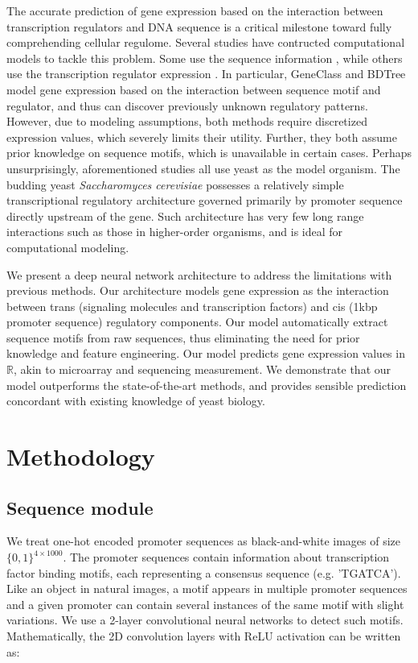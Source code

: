 \documentclass{article}
\begin{document}
The accurate prediction of gene expression based on the interaction between transcription regulators and DNA sequence is a critical milestone toward fully comprehending cellular regulome. Several studies have contructed computational models to tackle this problem. Some use the sequence information \cite{Bussemaker:2001ft,Phuong:2004kk}, while others use the transcription regulator expression \cite{Soinov:2003iz,Segal:2003ks}. In particular, GeneClass\cite{Middendorf:2004gta} and BDTree\cite{Ruan:2006hl} model gene expression based on the interaction between sequence motif and regulator, and thus can discover previously unknown regulatory patterns. However, due to modeling assumptions, both methods require discretized expression values, which severely limits their utility. Further, they both assume prior knowledge on sequence motifs, which is unavailable in certain cases. Perhaps unsurprisingly, aforementioned studies all use yeast as the model organism. The budding yeast \textit{Saccharomyces cerevisiae} possesses a relatively simple transcriptional regulatory architecture governed primarily by promoter sequence directly upstream of the gene. Such architecture has very few long range interactions such as those in higher-order organisms, and is ideal for computational modeling. 


We present a deep neural network architecture to address the limitations with previous methods. Our architecture models gene expression as the interaction between trans (signaling molecules and transcription factors) and cis (1kbp promoter sequence) regulatory components. Our model automatically extract sequence motifs from raw sequences, thus eliminating the need for prior knowledge and feature engineering. Our model predicts gene expression values in $\mathbb{R}$, akin to microarray and sequencing measurement. We demonstrate that our model outperforms the state-of-the-art methods, and provides sensible prediction concordant with existing knowledge of yeast biology.


\section{Methodology}

\subsection{Sequence module}
We treat one-hot encoded promoter sequences as black-and-white images of size $\{0,1\}^{4 \times 1000}$. The promoter sequences contain information about transcription factor binding motifs, each representing a consensus sequence (e.g. 'TGATCA'). Like an object in natural images, a motif appears in multiple promoter sequences and a given promoter can contain several instances of the same motif with slight variations. We use a 2-layer convolutional neural networks to detect such motifs. Mathematically, the 2D convolution layers with ReLU activation can be written as: 
\end{document}

